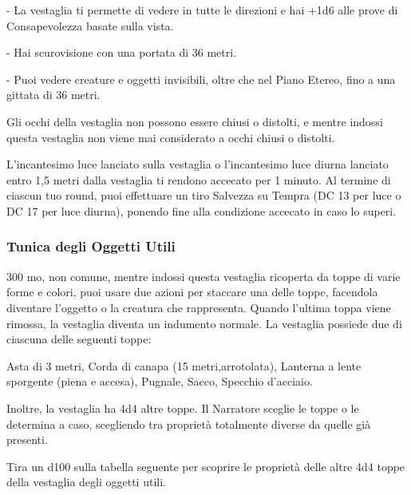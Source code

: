 \begin{multicols}{2}
- La vestaglia ti permette di vedere in tutte le direzioni e hai +1d6 alle prove di Consapevolezza basate sulla vista.

- Hai scurovisione con una portata di 36 metri.

- Puoi vedere creature e oggetti invisibili, oltre che nel Piano Etereo, fino a una gittata di 36 metri.

Gli occhi della vestaglia non possono essere chiusi o distolti, e mentre indossi questa vestaglia non viene mai considerato a occhi chiusi o distolti.

L'incantesimo luce lanciato sulla vestaglia o l'incantesimo luce diurna lanciato entro 1,5 metri dalla vestaglia ti rendono accecato per 1 minuto. Al termine di ciascun tuo round, puoi effettuare un tiro Salvezza su Tempra (DC 13 per luce o DC 17 per luce diurna), ponendo fine alla condizione accecato in caso lo superi.

\subsubsection*{Tunica degli Oggetti Utili}
300 mo, non comune, mentre indossi questa vestaglia ricoperta da toppe di varie forme e colori, puoi usare due azioni per staccare una delle toppe, facendola diventare l'oggetto o la creatura che rappresenta. Quando l'ultima toppa viene rimossa, la vestaglia diventa un indumento normale. La vestaglia possiede due di ciascuna delle seguenti toppe:

Asta di 3 metri, Corda di canapa (15 metri,arrotolata), Lanterna a lente sporgente (piena e accesa), Pugnale, Sacco, Specchio d'acciaio.

Inoltre, la vestaglia ha 4d4 altre toppe. Il Narratore sceglie le toppe o le determina a caso, scegliendo tra proprietà totalmente diverse da quelle già presenti.

Tira un d100 sulla tabella seguente per scoprire le proprietà delle altre 4d4 toppe della vestaglia degli oggetti utili.

\end{multicols}

